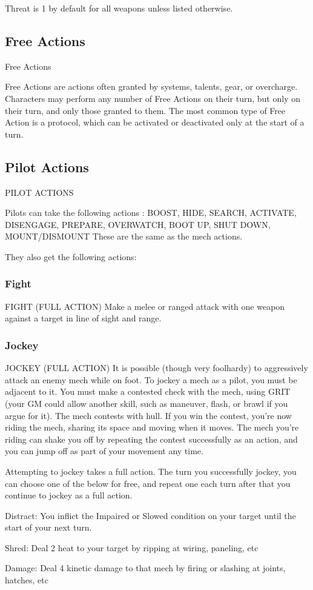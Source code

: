 Threat is 1 by default for all weapons unless listed otherwise.

\subsection{Free Actions}
   Free Actions

Free Actions are actions often granted by systems, talents, gear, or overcharge. Characters may
perform any number of Free Actions on their turn, but only on their turn, and only those granted
to them. The most common type of Free Action is a protocol, which can be activated or
deactivated only at the start of a turn.

\subsection{Pilot Actions}
   PILOT ACTIONS

Pilots can take the following actions : BOOST, HIDE, SEARCH, ACTIVATE, DISENGAGE,
PREPARE, OVERWATCH, BOOT UP, SHUT DOWN, MOUNT/DISMOUNT
These are the same as the mech actions.


They also get the following actions:

\subsubsection{Fight}
                                      FIGHT (FULL ACTION)
Make a melee or ranged attack with one weapon against a target in line of sight and range.

\subsubsection{Jockey}

                                    JOCKEY (FULL ACTION)
It is possible (though very foolhardy) to aggressively attack an enemy mech while on foot. To
jockey a mech as a pilot, you must be adjacent to it. You must make a contested check with the
mech, using GRIT (your GM could allow another skill, such as maneuver, flash, or brawl if you
argue for it). The mech contests with hull. If you win the contest, you’re now riding the mech,
sharing its space and moving when it moves. The mech you’re riding can shake you off by
repeating the contest successfully as an action, and you can jump off as part of your movement
any time.


Attempting to jockey takes a full action. The turn you successfully jockey, you can choose one of
the below for free, and repeat one each turn after that you continue to jockey as a full action.


Distract: You inflict the Impaired or Slowed condition on your target until the start of your next
turn.

Shred: Deal 2 heat to your target by ripping at wiring, paneling, etc

Damage: Deal 4 kinetic damage to that mech by firing or slashing at joints, hatches, etc

